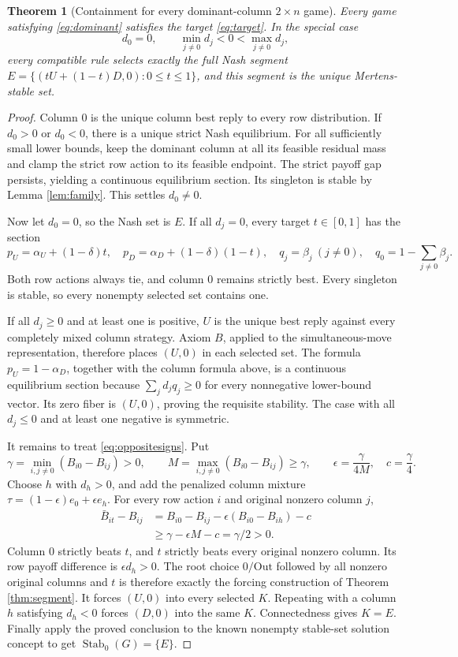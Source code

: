 \documentclass[11pt]{article}
\newcommand{\Stab}{\operatorname{Stab}_0}
\newtheorem{theorem}{Theorem}[section]
\theoremstyle{definition}
\theoremstyle{remark}
\begin{document}
\begin{theorem}[Containment for every dominant-column $2\times n$ game]
\label{thm:dominant}
Every game satisfying \eqref{eq:dominant} satisfies the target
\eqref{eq:target}. In the special case
\begin{equation}\label{eq:oppositesigns}
 d_0=0,\qquad \min_{j\ne0}d_j<0<\max_{j\ne0}d_j,
\end{equation}
every compatible rule selects exactly the full Nash segment
$E=\{(tU+(1-t)D,0):0\le t\le1\}$, and this segment is the unique
Mertens-stable set.
\end{theorem}
\begin{proof}
Column $0$ is the unique column best reply to every row distribution.
If $d_0>0$ or $d_0<0$, there is a unique strict Nash equilibrium.
For all sufficiently small lower bounds, keep the dominant column
at all its feasible residual mass and clamp the strict row action
to its feasible endpoint. The strict payoff gap persists, yielding a
continuous equilibrium section. Its singleton is stable by
Lemma \ref{lem:family}. This settles $d_0\ne0$.

Now let $d_0=0$, so the Nash set is $E$. If all $d_j=0$, every target
$t\in[0,1]$ has the section
\[
 p_U=\alpha_U+(1-\delta)t,\quad
 p_D=\alpha_D+(1-\delta)(1-t),\quad
 q_j=\beta_j\ (j\ne0),\quad q_0=1-\sum_{j\ne0}\beta_j.
\]
Both row actions always tie, and column $0$ remains strictly best.
Every singleton is stable, so every nonempty selected set contains one.

If all $d_j\ge0$ and at least one is positive, $U$ is the unique best
reply against every completely mixed column strategy. Axiom $B$, applied
to the simultaneous-move representation, therefore places $(U,0)$
in each selected set. The formula $p_U=1-\alpha_D$, together with the
column formula above, is a continuous equilibrium section because
$\sum_jd_jq_j\ge0$ for every nonnegative lower-bound vector. Its zero
fiber is $(U,0)$, proving the requisite stability. The case with all
$d_j\le0$ and at least one negative is symmetric.

It remains to treat \eqref{eq:oppositesigns}. Put
\[
 \gamma=\min_{i,j\ne0}(B_{i0}-B_{ij})>0,\qquad
 M=\max_{i,j\ne0}(B_{i0}-B_{ij})\ge\gamma,
 \qquad \epsilon=\frac{\gamma}{4M},\quad c=\frac\gamma4.
\]
Choose $h$ with $d_h>0$, and add the penalized column mixture
$\tau=(1-\epsilon)e_0+\epsilon e_h$. For every row action $i$
and original nonzero column $j$,
\begin{align*}
 \bar B_{it}-B_{ij}
 &= B_{i0}-B_{ij}-\epsilon(B_{i0}-B_{ih})-c\\
 &\ge\gamma-\epsilon M-c=\gamma/2>0.
\end{align*}
Column $0$ strictly beats $t$, and $t$ strictly beats every original
nonzero column. Its row payoff difference is $\epsilon d_h>0$.
The root choice $0/\mathrm{Out}$ followed by all nonzero original
columns and $t$ is therefore exactly the forcing construction of
Theorem \ref{thm:segment}. It forces $(U,0)$ into every selected $K$.
Repeating with a column $h$ satisfying $d_h<0$ forces $(D,0)$ into the
same $K$. Connectedness gives $K=E$. Finally apply the proved conclusion
to the known nonempty stable-set solution concept to get
$\Stab(G)=\{E\}$.


\end{proof}
\end{document}
